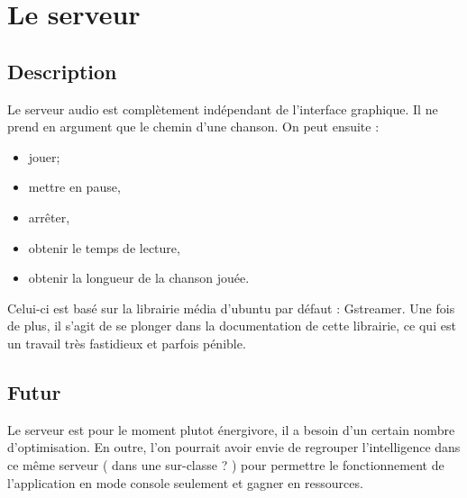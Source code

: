 \documentclass{report}
\begin{document}
\section*{Le serveur}

\subsection*{Description}

Le serveur audio est complètement indépendant de l'interface graphique. Il ne prend en argument que le chemin d'une chanson. On peut ensuite :
\begin{itemize}
\item jouer;
\item mettre en pause,
\item arrêter,
\item obtenir le temps de lecture,
\item obtenir la longueur de la chanson jouée.
\end{itemize}

Celui-ci est basé sur la librairie média d'ubuntu par défaut : Gstreamer. Une fois de plus, il s'agit de se plonger dans la documentation de cette librairie, ce qui est un travail très fastidieux et parfois pénible.

\subsection*{Futur}

Le serveur est pour le moment plutot énergivore, il a besoin d'un certain nombre d'optimisation. En outre, l'on pourrait avoir envie de regrouper l'intelligence dans ce même serveur ( dans une sur-classe ? ) pour permettre le fonctionnement de l'application en mode console seulement et gagner en ressources.
\end{document}
